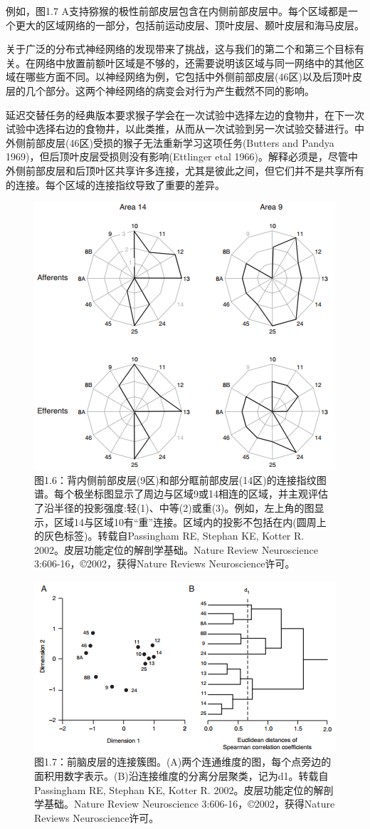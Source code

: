 \par
例如，图1.7 A支持猕猴的极性前部皮层包含在内侧前部皮层中。每个区域都是一个更大的区域网络的一部分，包括前运动皮层、顶叶皮层、颞叶皮层和海马皮层。

\par
关于广泛的分布式神经网络的发现带来了挑战，这与我们的第二个和第三个目标有关。在网络中放置前额叶区域是不够的，还需要说明该区域与同一网络中的其他区域在哪些方面不同。以神经网络为例，它包括中外侧前部皮层(46区)以及后顶叶皮层的几个部分。这两个神经网络的病变会对行为产生截然不同的影响。

\par
延迟交替任务的经典版本要求猴子学会在一次试验中选择左边的食物井，在下一次试验中选择右边的食物井，以此类推，从而从一次试验到另一次试验交替进行。中外侧前部皮层(46区)受损的猴子无法重新学习这项任务(Butters and Pandya 1969)，但后顶叶皮层受损则没有影响(Ettlinger etal 1966)。解释必须是，尽管中外侧前部皮层和后顶叶区共享许多连接，尤其是彼此之间，但它们并不是共享所有的连接。每个区域的连接指纹导致了重要的差异。


\begin{figure}[!htb]
	\centering
	\includegraphics[width=0.5\linewidth]{image_pfc/Fig_1_6}
	\caption*{图1.6：背内侧前部皮层(9区)和部分眶前部皮层(14区)的连接指纹图谱。每个极坐标图显示了周边与区域9或14相连的区域，并主观评估了沿半径的投影强度:轻(1)、中等(2)或重(3)。例如，左上角的图显示，区域14与区域10有“重”连接。区域内的投影不包括在内(圆周上的灰色标签)。转载自Passingham RE, Stephan KE, Kotter R. 2002。皮层功能定位的解剖学基础。Nature Review Neuroscience 3:606-16，©2002，获得Nature Reviews Neuroscience许可。}
\end{figure}

\begin{figure}[!htb]
	\centering
	\includegraphics[width=0.5\linewidth]{image_pfc/Fig_1_7}
	\caption*{图1.7：前脑皮层的连接簇图。(A)两个连通维度的图，每个点旁边的面积用数字表示。(B)沿连接维度的分离分层聚类，记为d1。转载自Passingham RE, Stephan KE, Kotter R. 2002。皮层功能定位的解剖学基础。Nature Review Neuroscience 3:606-16，©2002，获得Nature Reviews Neuroscience许可。}
\end{figure}


